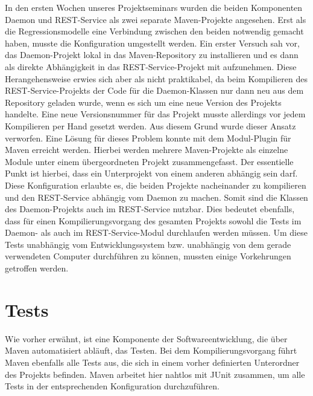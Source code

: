In den ersten Wochen unseres Projektseminars wurden die beiden Komponenten Daemon und 
REST-Service als zwei separate Maven-Projekte angesehen. Erst als die 
Regressionsmodelle eine Verbindung zwischen den beiden notwendig gemacht haben, musste 
die Konfiguration umgestellt werden. Ein erster Versuch sah vor, das Daemon-Projekt lokal in das Maven-Repository zu installieren und es dann als direkte Abhängigkeit in das REST-Service-Projekt mit aufzunehmen. Diese Herangehensweise erwies sich aber als nicht praktikabel, da beim Kompilieren des REST-Service-Projekts der Code für die Daemon-Klassen nur dann neu aus dem Repository geladen wurde, wenn es sich um eine neue Version des Projekts handelte. Eine neue Versionsnummer für das Projekt musste allerdings vor jedem Kompilieren per Hand gesetzt werden. Aus diesem Grund wurde dieser Ansatz verworfen. Eine Lösung für dieses Problem konnte mit dem Modul-Plugin für Maven erreicht werden. Hierbei werden mehrere Maven-Projekte als einzelne Module unter einem übergeordneten Projekt zusammengefasst. Der essentielle Punkt ist hierbei, dass ein Unterprojekt von einem anderen abhängig sein darf. Diese Konfiguration erlaubte es, die beiden Projekte nacheinander zu kompilieren und den REST-Service abhängig vom Daemon zu machen. Somit sind die Klassen des Daemon-Projekts auch im REST-Service nutzbar. Dies bedeutet ebenfalls, dass für einen 
Kompilierungsvorgang des gesamten Projekts sowohl die Tests im Daemon- als auch im 
REST-Service-Modul durchlaufen werden müssen. Um diese Tests unabhängig vom 
Entwicklungssystem bzw. unabhängig von dem gerade verwendeten Computer durchführen zu 
können, mussten einige Vorkehrungen getroffen werden.

\section{Tests}
Wie vorher erwähnt, ist eine Komponente der Softwareentwicklung, die über Maven 
automatisiert abläuft, das Testen. Bei dem Kompilierungsvorgang führt Maven ebenfalls 
alle Tests aus, die sich in einem vorher definierten Unterordner des Projekts 
befinden. Maven arbeitet hier nahtlos mit JUnit zusammen, um alle Tests in der 
entsprechenden Konfiguration durchzuführen.

